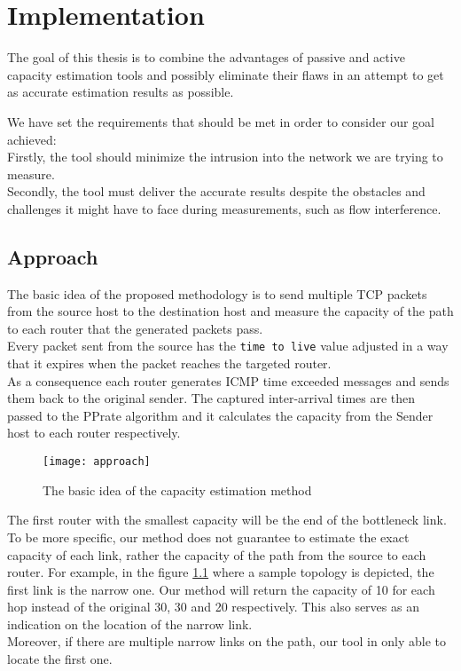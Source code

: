 \chapter{Implementation}

The goal of this thesis is to combine the advantages of passive and active capacity estimation tools and possibly eliminate their flaws in an attempt to get as accurate estimation results as possible.

We have set the requirements that should be met in order to consider our goal achieved:\\
Firstly, the tool should minimize the intrusion into the network we are trying to measure.\\
Secondly, the tool must deliver the accurate results despite the obstacles and challenges it might have to face during measurements, such as flow interference.


\section{Approach}
The basic idea of the proposed methodology is to send multiple TCP packets from the source host to the destination host and measure the capacity of the path to each router that the generated packets pass.
\\Every packet sent from the source has the \texttt{time to live} value adjusted in a way that it expires when the packet reaches the targeted router. 
\\As a consequence each router generates ICMP time exceeded messages and sends them back to the original sender. The captured inter-arrival times are then passed to the PPrate algorithm and it calculates the capacity from the Sender host to each router respectively. 

\begin{figure}[h]
 \centering
 \texttt{[image: approach]}
 \caption{The basic idea of the capacity estimation method}
 \label{approach}
\end{figure}

The first router with the smallest capacity will be the end of the bottleneck link.
To be more specific, our method does not guarantee to estimate the exact capacity of each link, rather the capacity of the path from the source to each router.
For example, in the figure \ref{approach} where a sample topology is depicted, the first link is the narrow one. Our method will return the capacity of 10 for each hop instead of the original 30, 30 and 20 respectively. This also serves as an indication on the location of the narrow link.\\
Moreover, if there are multiple narrow links on the path, our tool in only able to locate the first one.

